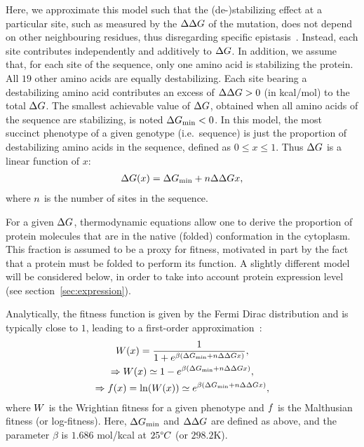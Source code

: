 Here, we approximate this model such that the (de-)stabilizing effect at a particular site, such as measured by the $\Delta \Delta G$ of the mutation, does not depend on other neighbouring residues, thus disregarding specific epistasis~\citep{Dasmeh2014}.
Instead, each site contributes independently and additively to $\Delta G$.
In addition, we assume that, for each site of the sequence, only one amino acid is stabilizing the protein.
All $19$ other amino acids are equally destabilizing.
Each site bearing a destabilizing amino acid contributes an excess of $\Delta \Delta G > 0$ (in kcal/mol) to the total $\Delta G$.
The smallest achievable value of $\Delta G$, obtained when all amino acids of the sequence are stabilizing, is noted $ \Delta G_{\text{min}} < 0$.
In this model, the most succinct {phenotype} of a given genotype (i.e.~sequence) is just the proportion of destabilizing amino acids in the sequence, defined as $0 \leq x \leq 1$.
Thus $\Delta G$ is a linear function of $x$:
\begin{align}
    \Delta G (x) = \Delta G_{\text{min}} + n \Delta \Delta G x,
\end{align}
where $n$ is the number of sites in the sequence.

For a given $\Delta G$, thermodynamic equations allow one to derive the proportion of protein molecules that are in the native (folded) conformation in the cytoplasm.
This fraction is assumed to be a proxy for fitness, motivated in part by the fact that a protein must be folded to perform its function.
A slightly different model will be considered below, in order to take into account protein expression level (see section~\ref{sec:expression}).

Analytically, the fitness function is given by the Fermi Dirac distribution and is typically close to $1$, leading to a first-order approximation~\citep{Goldstein2011}:
\begin{gather}
    W (x) = \dfrac{1}{1 + e^{\beta (\Delta G_{\text{min}} + n \Delta \Delta G x)}},\\
    \Rightarrow W (x) \simeq 1 - e^{\beta (\Delta G_{\text{min}} + n \Delta \Delta G x)},\\
    \Rightarrow f (x) = \ln ( W (x) ) \simeq e^{\beta (\Delta G_{\text{min}} + n \Delta \Delta G x)},
\end{gather}
where $W$ is the Wrightian fitness for a given {phenotype} and $f $ is the Malthusian fitness (or log-fitness).
Here, $\Delta G_{\text{min}}$ and $\Delta \Delta G$ are defined as above, and the parameter $\beta$ is $1.686$ mol/kcal at $25 \degree C$ (or $298.2$K).

